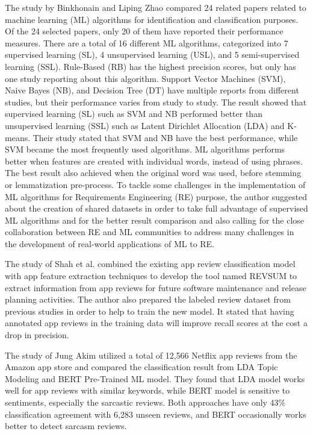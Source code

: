 \documentclass[12pt]{article}
\begin{document}
The study by Binkhonain and Liping Zhao \cite{review_ml} compared 24 related papers related to machine learning (ML) algorithms for identification and classification purposes. Of the 24 selected papers, only 20 of them have reported their performance measures. There are a total of 16 different ML algorithms, categorized into 7 supervised learning (SL), 4 unsupervised learning (USL), and 5 semi-supervised learning (SSL). Rule-Based (RB) has the highest precision scores, but only has one study reporting about this algorithm. Support Vector Machines (SVM), Naive Bayes (NB), and Decision Tree (DT) have multiple reports from different studies, but their performance varies from study to study. The result showed that supervised learning (SL) such as SVM and NB performed better than unsupervised learning (SSL) such as Latent Dirichlet Allocation (LDA) and K-means. Their study stated that SVM and NB have the best performance, while SVM became the most frequently used algorithms. ML algorithms performs better when features are created with individual words, instead of using phrases. The best result also achieved when the original word was used, before stemming or lemmatization pre-process. To tackle some challenges in the implementation of ML algorithms for Requirements Engineering (RE) purpose, the author suggested about the creation of shared datasets in order to take full advantage of supervised ML algorithms and for the better result comparison and also calling for the close collaboration between RE and ML communities to address many challenges in the development of real-world applications of ML to RE.

The study of Shah et al. \cite{faiz_ali} combined the existing app review classification model with app feature extraction techniques to develop the tool named REVSUM to extract information from app reviews for future software maintenance and release planning activities. The author also prepared the labeled review dataset from previous studies in order to help to train the new model. It stated that having annotated app reviews in the training data will improve recall scores at the cost a drop in precision.

The study of Jung Akim \cite{jung_kim} utilized a total of 12,566 Netflix app reviews from the Amazon app store and compared the classification result from LDA Topic Modeling and BERT Pre-Trained ML model. They found that LDA model works well for app reviews with similar keywords, while BERT model is sensitive to sentiments, especially the sarcastic reviews. Both approaches have only 43\% classification agreement with 6,283 unseen reviews, and BERT occasionally works better to detect sarcasm reviews.
\end{document}
